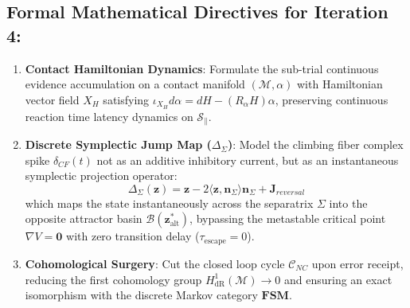 \documentclass[11pt,a4paper]{article}
\begin{document}
\subsection{Formal Mathematical Directives for Iteration 4:}
\begin{enumerate}
    \item \textbf{Contact Hamiltonian Dynamics}: Formulate the sub-trial continuous evidence accumulation on a contact manifold $(\mathcal{M}, \alpha)$ with Hamiltonian vector field $X_H$ satisfying $\iota_{X_H} d\alpha = dH - (R_\alpha H)\alpha$, preserving continuous reaction time latency dynamics on $\mathcal{S}_\parallel$.
    \item \textbf{Discrete Symplectic Jump Map ($\Delta_\Sigma$)}: Model the climbing fiber complex spike $\delta_{CF}(t)$ not as an additive inhibitory current, but as an instantaneous symplectic projection operator:
    \begin{equation}
    \Delta_\Sigma(\mathbf{z}) = \mathbf{z} - 2 \langle \mathbf{z}, \mathbf{n}_\Sigma \rangle \mathbf{n}_\Sigma + \mathbf{J}_{reversal}
    \end{equation}
    which maps the state instantaneously across the separatrix $\Sigma$ into the opposite attractor basin $\mathcal{B}(\mathbf{z}_{\text{alt}}^*)$, bypassing the metastable critical point $\nabla V = \mathbf{0}$ with zero transition delay ($\tau_{\text{escape}} = 0$).
    \item \textbf{Cohomological Surgery}: Cut the closed loop cycle $\mathcal{C}_{NC}$ upon error receipt, reducing the first cohomology group $H^1_{\text{dR}}(\mathcal{M}) \to 0$ and ensuring an exact isomorphism with the discrete Markov category $\mathbf{FSM}$.
\end{enumerate}
\end{document}
